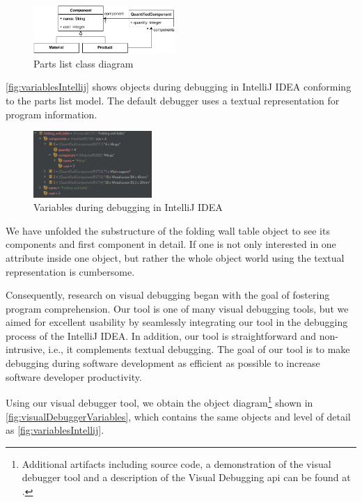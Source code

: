 \documentclass[conference]{IEEEtran}
\newcommand{\intellij}{IntelliJ IDEA}
\begin{document}
\begin{figure}[h]
    \centering
    \includegraphics[width=0.48\textwidth]{images/VD-parts list class diagram.pdf}
    \caption{Parts list class diagram}
    \label{fig:partsListModel}
\end{figure}

\autoref{fig:variablesIntellij} shows objects during debugging in \intellij{} conforming to the parts list model. 
The default debugger uses a textual representation for program information.

\begin{figure}[h]
    \centering
    \includegraphics[width=0.4\textwidth]{images/variables.png}
    \caption{Variables during debugging in \intellij}
    \label{fig:variablesIntellij}
\end{figure}

We have unfolded the substructure of the \textsf{folding wall table} object to see its components and first component in detail.
If one is not only interested in one attribute inside one object, but rather the whole object world using the textual representation is cumbersome.

Consequently, research on visual debugging began with the goal of fostering program comprehension.
Our tool is one of many visual debugging tools, but we aimed for excellent usability by seamlessly integrating our tool in the debugging process of the \intellij{}.
In addition, our tool is straightforward and non-intrusive, i.e., it complements textual debugging.
The goal of our tool is to make debugging during software development as efficient as possible to increase software developer productivity.

Using our visual debugger tool, we obtain the object diagram\footnote{\label{footnote:artifacts} Additional artifacts including source code, a demonstration of the visual debugger tool and a description of the Visual Debugging \acrshort*{api} can be found at \cite{ArtifactsICSME2022}.} shown in \autoref{fig:visualDebuggerVariables}, which contains the same objects and level of detail as \autoref{fig:variablesIntellij}.
\end{document}
